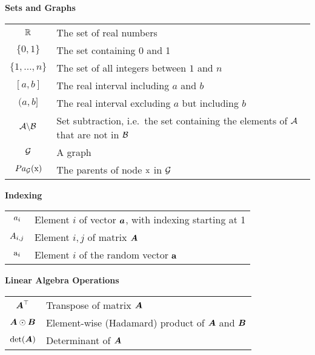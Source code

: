 \vspace{\notationgap}
\begin{minipage}{\textwidth}
	\centerline{\bf Sets and Graphs}
	\bgroup
	\def\arraystretch{1.5}
	\begin{tabular}{cp{3.25in}}
		$\displaystyle \mathbb{R}$ & The set of real numbers \\
		$\displaystyle \{0, 1\}$ & The set containing 0 and 1 \\
		$\displaystyle \{1, \dots, n \}$ & The set of all integers between $1$ and $n$\\
		$\displaystyle [a, b]$ & The real interval including $a$ and $b$\\
		$\displaystyle (a, b]$ & The real interval excluding $a$ but including $b$\\
		$\displaystyle {\mathcal{A}} \backslash {\mathcal{B}}$ & Set subtraction, i.e.\ the set containing the elements of ${\mathcal{A}}$ that are not in ${\mathcal{B}}$\\
		$\displaystyle {\mathcal{G}}$ & A graph\\
		$\displaystyle Pa_{\mathcal{G}}({\textnormal{x}})$ & The parents of node ${\textnormal{x}}$ in ${\mathcal{G}}$
	\end{tabular}
	\egroup
\end{minipage}

\vspace{\notationgap}
\begin{minipage}{\textwidth}
	\centerline{\bf Indexing}
	\bgroup
	\def\arraystretch{1.5}
	\begin{tabular}{cp{3.25in}}
		$\displaystyle {a}_i$ & Element $i$ of vector ${\bm{a}}$, with indexing starting at 1 \\
		$\displaystyle {A}_{i,j}$ & Element $i, j$ of matrix ${\bm{A}}$ \\
		$\displaystyle {\textnormal{a}}_i$ & Element $i$ of the random vector ${\mathbf{a}}$ \\
	\end{tabular}
	\egroup
\end{minipage}

\vspace{\notationgap}
\begin{minipage}{\textwidth}
	\centerline{\bf Linear Algebra Operations}
	\bgroup
	\def\arraystretch{1.5}
	\begin{tabular}{cp{3.25in}}
		$\displaystyle {\bm{A}} ^\top$ & Transpose of matrix ${\bm{A}}$ \\
		$\displaystyle {\bm{A}} \odot {\bm{B}} $ & Element-wise (Hadamard) product of ${\bm{A}}$ and ${\bm{B}}$ \\
		$\displaystyle \mathrm{det}({\bm{A}})$ & Determinant of ${\bm{A}}$ \\
	\end{tabular}
	\egroup
\end{minipage}


